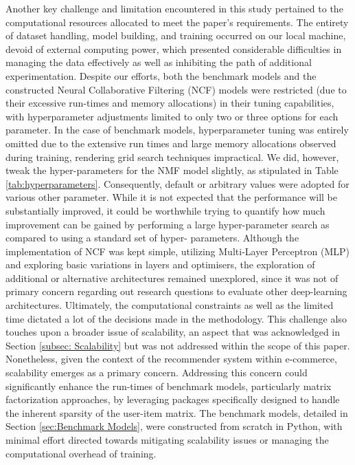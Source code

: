 Another key challenge and limitation encountered in this study pertained to the computational resources allocated to meet the paper's requirements. The entirety of dataset handling, model building, and training occurred on our local machine, devoid of external computing power, which presented considerable difficulties in managing the data effectively as well as inhibiting the path of additional experimentation. Despite our efforts, both the benchmark models and the constructed Neural Collaborative Filtering (NCF) models were restricted (due to their excessive run-times and memory allocations) in their tuning capabilities, with hyperparameter adjustments limited to only two or three options for each parameter. In the case of benchmark models, hyperparameter tuning was entirely omitted due to the extensive run times and large memory allocations observed during training, rendering grid search techniques impractical. We did, however, tweak the hyper-parameters for the NMF model slightly, as stipulated in Table \ref{tab:hyperparameters}. Consequently, default or arbitrary values were adopted for various other parameter. While it is not expected that the performance will be substantially improved, it could be worthwhile trying to quantify how much improvement can be gained by performing a large hyper-parameter search as compared to using a standard set of hyper- parameters. Although the implementation of NCF was kept simple, utilizing Multi-Layer Perceptron (MLP) and exploring basic variations in layers and optimisers, the exploration of additional or alternative architectures remained unexplored, since it was not of primary concern regarding out research questions to evaluate other deep-learning architectures. Ultimately, the computational constraints as well as the limited time dictated a lot of the decisions made in the methodology. This challenge also touches upon a broader issue of scalability, an aspect that was acknowledged in Section \ref{subsec: Scalability} but was not addressed within the scope of this paper. Nonetheless, given the context of the recommender system within e-commerce, scalability emerges as a primary concern. Addressing this concern could significantly enhance the run-times of benchmark models, particularly matrix factorization approaches, by leveraging packages specifically designed to handle the inherent sparsity of the user-item matrix. The benchmark models, detailed in Section \ref{sec:Benchmark Models}, were constructed from scratch in Python, with minimal effort directed towards mitigating scalability issues or managing the computational overhead of training.

